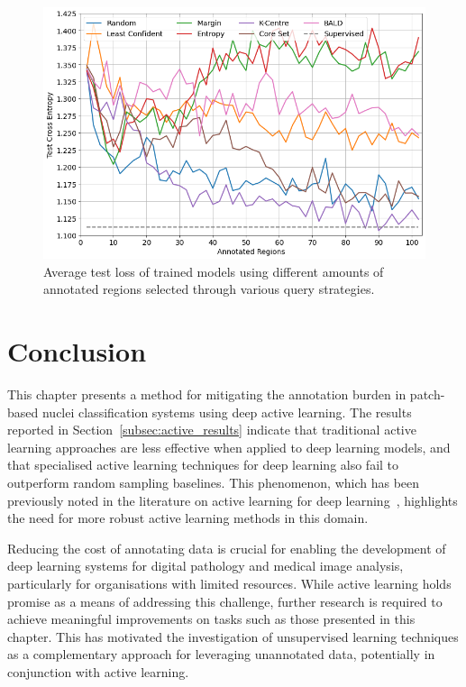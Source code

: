 \begin{figure}
	\centering
	\includegraphics[width=\textwidth]{images/active_learning_loss.png}
	\caption{Average test loss of trained models using different amounts of annotated regions selected through various query strategies.}
	\label{fig:active_learning_loss}
\end{figure}



\section{Conclusion}
\label{sec:active_conclusion}
This chapter presents a method for mitigating the annotation burden in patch-based nuclei classification systems using deep active learning. The results reported in Section~\ref{subsec:active_results} indicate that traditional active learning approaches are less effective when applied to deep learning models, and that specialised active learning techniques for deep learning also fail to outperform random sampling baselines. This phenomenon, which has been previously noted in the literature on active learning for deep learning~\citep{ren2021survey}, highlights the need for more robust active learning methods in this domain.

Reducing the cost of annotating data is crucial for enabling the development of deep learning systems for digital pathology and medical image analysis, particularly for organisations with limited resources. While active learning holds promise as a means of addressing this challenge, further research is required to achieve meaningful improvements on tasks such as those presented in this chapter. This has motivated the investigation of unsupervised learning techniques as a complementary approach for leveraging unannotated data, potentially in conjunction with active learning.